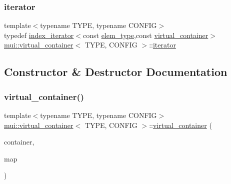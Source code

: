 \subsubsection{\texorpdfstring{iterator}{iterator}}
{\footnotesize\ttfamily template$<$typename T\+Y\+PE, typename C\+O\+N\+F\+IG$>$ \\
typedef \hyperlink{structmui_1_1index__iterator}{index\+\_\+iterator}$<$const \hyperlink{classmui_1_1virtual__container_a5539ad526cf676a5852858dd8da7eca2}{elem\+\_\+type},const \hyperlink{classmui_1_1virtual__container}{virtual\+\_\+container}$>$ \hyperlink{classmui_1_1virtual__container}{mui\+::virtual\+\_\+container}$<$ T\+Y\+PE, C\+O\+N\+F\+IG $>$\+::\hyperlink{classmui_1_1virtual__container_ab8a791b2f30b5a59f0bcc06b417d10fc}{iterator}}



\subsection{Constructor \& Destructor Documentation}
\mbox{\label{classmui_1_1virtual__container_ae1b44658f8ef2a5d26984be46209cc67}} 
\subsubsection{\texorpdfstring{virtual\+\_\+container()}{virtual\_container()}\hspace{0.1cm}{\footnotesize\ttfamily [1/2]}}
{\footnotesize\ttfamily template$<$typename T\+Y\+PE, typename C\+O\+N\+F\+IG$>$ \\
\hyperlink{classmui_1_1virtual__container}{mui\+::virtual\+\_\+container}$<$ T\+Y\+PE, C\+O\+N\+F\+IG $>$\+::\hyperlink{classmui_1_1virtual__container}{virtual\+\_\+container} (\begin{DoxyParamCaption}\item[{const \hyperlink{classmui_1_1virtual__container_a4f84af2177deb7ad3664c6f5935164be}{container\+\_\+type} \&}]{container,  }\item[{std\+::vector$<$ size\+\_\+t $>$}]{map }\end{DoxyParamCaption})\hspace{0.3cm}{\ttfamily [inline]}}

\mbox{\label{classmui_1_1virtual__container_a1136dbe62bc392d79eed0f12878e2227}} 

